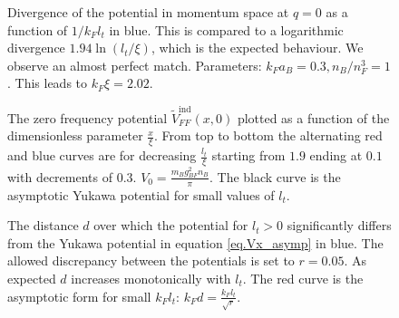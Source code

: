 \begin{figure} 
\begin{center}  
  
\caption{Divergence of the potential in momentum space at $q=0$ as a function of $1/k_Fl_t$ in blue. This is compared to a logarithmic divergence $1.94\ln(l_t/\xi)$, which is the expected behaviour. We observe an almost perfect match. Parameters: $k_F a_B = 0.3, n_B/n_F^3 = 1$. This leads to $k_F\xi = 2.02$.}
\label{fig.Vq0}  
\end{center}    
\end{figure}

\begin{figure} 
\begin{center}  
  
\caption{The zero frequency potential $\tilde{V}_{FF}^\text{ind}(x,0)$ plotted as a function of the dimensionless parameter $\frac{x}{\xi}$. From top to bottom the alternating red and blue curves are for decreasing $\frac{l_t}{\xi}$ starting from $1.9$ ending at $0.1$ with decrements of $0.3$. $V_0 = \frac{m_Bg_{BF}^2n_B}{\pi}$. The black curve is the asymptotic Yukawa potential for small values of $l_t$.}  
\label{fig.Vx}  
\end{center}    
\end{figure}

\begin{figure} 
\begin{center}  
  
\caption{The distance $d$ over which the potential for $l_t > 0$ significantly differs from the Yukawa potential in equation \eqref{eq.Vx_asymp} in blue. The allowed discrepancy between the potentials is set to $r=0.05$. As expected $d$ increases monotonically with $l_t$. The red curve is the asymptotic form for small $k_Fl_t$: $k_Fd=\frac{k_F l_t}{\sqrt{r}}$.}  
\label{fig.Vx_disc}  
\end{center}    
\end{figure}








